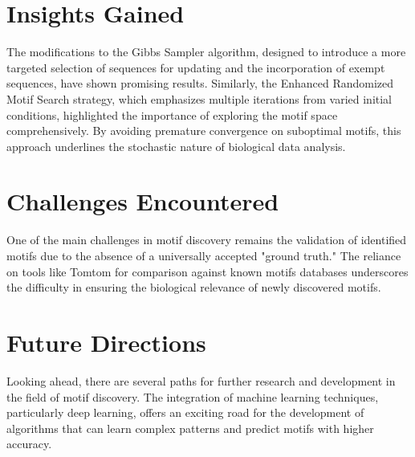 \documentclass{report}
\begin{document}
\section{Insights Gained}

The modifications to the Gibbs Sampler algorithm, designed to introduce a more targeted selection of sequences for updating and the incorporation of exempt sequences, have shown promising results. 
Similarly, the Enhanced Randomized Motif Search strategy, which emphasizes multiple iterations from varied initial conditions, highlighted the importance of exploring the motif space comprehensively. By avoiding premature convergence on suboptimal motifs, this approach underlines the stochastic nature of biological data analysis.

\section{Challenges Encountered}

One of the main challenges in motif discovery remains the validation of identified motifs due to the absence of a universally accepted "ground truth." The reliance on tools like Tomtom for comparison against known motifs databases underscores the difficulty in ensuring the biological relevance of newly discovered motifs. 

\section{Future Directions}

Looking ahead, there are several paths for further research and development in the field of motif discovery. The integration of machine learning techniques, particularly deep learning, offers an exciting road for the development of algorithms that can learn complex patterns and predict motifs with higher accuracy. 




\renewcommand{\bibname}{References}

\end{document}

